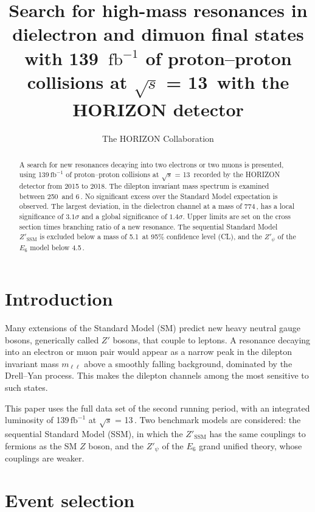 \documentclass[aps,prd,twocolumn,nofootinbib]{revtex4-2}
\newcommand{\ifb}{\ensuremath{\text{fb}^{-1}}}
\newcommand{\Zprime}{\ensuremath{Z'}}
\newcommand{\ZSSM}{\ensuremath{Z'_\mathrm{SSM}}}
\newcommand{\Zpsi}{\ensuremath{Z'_\psi}}
\newcommand{\mll}{\ensuremath{m_{\ell\ell}}}
\newcommand{\sqs}{\ensuremath{\sqrt{s}}}
\begin{document}
\title{Search for high-mass resonances in dielectron and dimuon final states with \mbox{139 \ifb} of proton--proton collisions at \sqs{} = 13\,\TeV{} with the HORIZON detector}

\author{The HORIZON Collaboration}

\begin{abstract}
A search for new resonances decaying into two electrons or two muons is presented, using \mbox{139\,\ifb} of proton--proton collisions at \sqs{} = 13\,\TeV{} recorded by the HORIZON detector from 2015 to 2018. The dilepton invariant mass spectrum is examined between 250\,\GeV{} and 6\,\TeV. No significant excess over the Standard Model expectation is observed. The largest deviation, in the dielectron channel at a mass of 774\,\GeV, has a local significance of $3.1\sigma$ and a global significance of $1.4\sigma$. Upper limits are set on the cross section times branching ratio of a new resonance. The sequential Standard Model \ZSSM{} is excluded below a mass of 5.1\,\TeV{} at 95\% confidence level (CL), and the \Zpsi{} of the $E_6$ model below 4.5\,\TeV.
\end{abstract}

\maketitle

\section{Introduction}

Many extensions of the Standard Model (SM) predict new heavy neutral gauge bosons, generically called \Zprime{} bosons, that couple to leptons. A resonance decaying into an electron or muon pair would appear as a narrow peak in the dilepton invariant mass \mll{} above a smoothly falling background, dominated by the Drell--Yan process. This makes the dilepton channels among the most sensitive to such states.

This paper uses the full data set of the second running period, with an integrated luminosity of 139\,\ifb{} at \sqs{} = 13\,\TeV. Two benchmark models are considered: the sequential Standard Model (SSM), in which the \ZSSM{} has the same couplings to fermions as the SM $Z$ boson, and the \Zpsi{} of the $E_6$ grand unified theory, whose couplings are weaker.

\section{Event selection}
\end{document}
